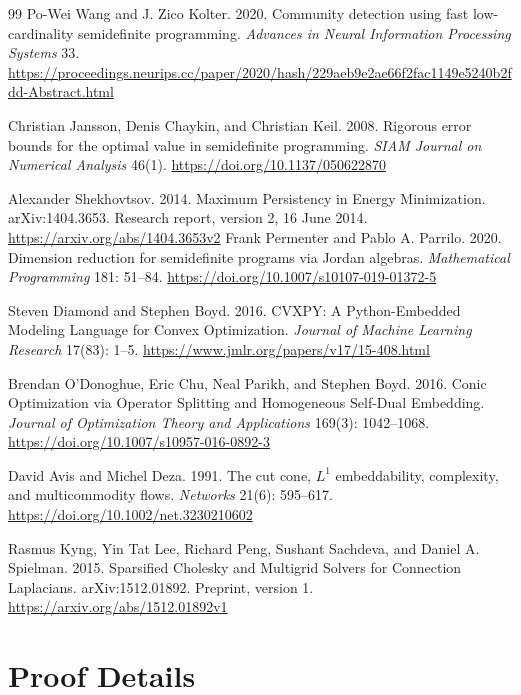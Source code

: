\documentclass[sigconf,anonymous,review]{acmart}
\newcommand{\1}{\mathbf{1}}
\begin{document}
\begin{thebibliography}{99}
Po-Wei Wang and J. Zico Kolter. 2020. Community detection using fast low-cardinality semidefinite programming. \emph{Advances in Neural Information Processing Systems} 33. \url{https://proceedings.neurips.cc/paper/2020/hash/229aeb9e2ae66f2fac1149e5240b2fdd-Abstract.html}

Christian Jansson, Denis Chaykin, and Christian Keil. 2008. Rigorous error bounds for the optimal value in semidefinite programming. \emph{SIAM Journal on Numerical Analysis} 46(1). \url{https://doi.org/10.1137/050622870}

Alexander Shekhovtsov. 2014. Maximum Persistency in Energy Minimization. arXiv:1404.3653. Research report, version 2, 16 June 2014. \url{https://arxiv.org/abs/1404.3653v2}
Frank Permenter and Pablo A. Parrilo. 2020. Dimension reduction for semidefinite programs via Jordan algebras. \emph{Mathematical Programming} 181: 51--84. \url{https://doi.org/10.1007/s10107-019-01372-5}

Steven Diamond and Stephen Boyd. 2016. CVXPY: A Python-Embedded Modeling Language for Convex Optimization. \emph{Journal of Machine Learning Research} 17(83): 1--5. \url{https://www.jmlr.org/papers/v17/15-408.html}

Brendan O'Donoghue, Eric Chu, Neal Parikh, and Stephen Boyd. 2016. Conic Optimization via Operator Splitting and Homogeneous Self-Dual Embedding. \emph{Journal of Optimization Theory and Applications} 169(3): 1042--1068. \url{https://doi.org/10.1007/s10957-016-0892-3}

David Avis and Michel Deza. 1991. The cut cone, $L^1$ embeddability, complexity, and multicommodity flows. \emph{Networks} 21(6): 595--617. \url{https://doi.org/10.1002/net.3230210602}

Rasmus Kyng, Yin Tat Lee, Richard Peng, Sushant Sachdeva, and Daniel A. Spielman. 2015. Sparsified Cholesky and Multigrid Solvers for Connection Laplacians. arXiv:1512.01892. Preprint, version 1. \url{https://arxiv.org/abs/1512.01892v1}

\end{thebibliography}

\appendix
\section{Proof Details}\label{app:proofs}
\end{document}
